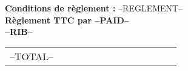 \documentclass[a4paper, oneside, 10pt, french]{article}
\newcommand{\ghline}{\arrayrulecolor{gray}\hline\arrayrulecolor{black}}
\begin{document}
\begin{minipage}[t]{0.48\textwidth}
{\footnotesize \textbf{Conditions de règlement :} --REGLEMENT--}\\
\textbf{{\footnotesize Règlement TTC par --PAID--\\
--RIB--
} }\\
\end{minipage}
\hspace{2mm}
\begin{minipage}[t]{0.50\textwidth}
\begin{flushright}
\begin{tabular}{p{4.5cm} r}
--TOTAL--
\rowcolor{chaumeil-violet}\textcolor{white}{NET à payer} &\textcolor{white}{--APAYER--} \\ 
\end{tabular} 
\end{flushright}
\end{minipage}


\end{document}
